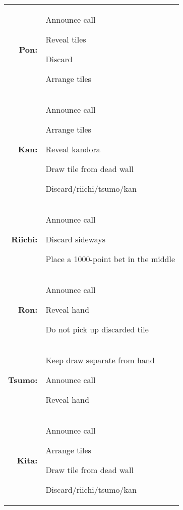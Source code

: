 \begin{tabularx}{\linewidth}{rX}
  {\large\bfseries Pon:} & 
  \begin{callprocedure}
    \item Announce call
    \item Reveal tiles
    \item Discard
    \item Arrange tiles
  \end{callprocedure} \\
  {\large\bfseries Kan:} & 
  \begin{callprocedure}
    \item Announce call
    \item Arrange tiles
    \item Reveal kandora
    \item Draw tile from dead wall
    \item Discard/\linebreak[0]riichi/\linebreak[0]tsumo/\linebreak[0]kan
  \end{callprocedure} \\
  {\large\bfseries Riichi:} & 
  \begin{callprocedure}
    \item Announce call
    \item Discard sideways
    \item Place a 1000-point bet in the middle
  \end{callprocedure} \\
  {\large\bfseries Ron:} & 
  \begin{callprocedure}
    \item Announce call
    \item Reveal hand
    \item Do not pick up discarded tile
  \end{callprocedure} \\
  {\large\bfseries Tsumo:} & 
  \begin{callprocedure}
  \item Keep draw separate from hand
  \item Announce call
  \item Reveal hand
  \end{callprocedure} \\
  {\large\bfseries Kita:} & 
  \begin{callprocedure}
    \item Announce call
    \item Arrange tiles
    \item Draw tile from dead wall
    \item Discard/\linebreak[0]riichi/\linebreak[0]tsumo/\linebreak[0]kan
  \end{callprocedure}

\end{tabularx}
